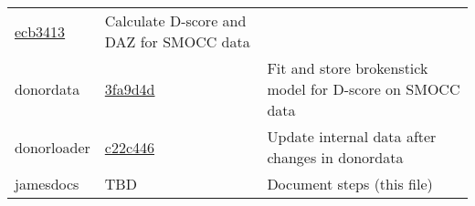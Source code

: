 \documentclass[]{book}
\begin{document}
\begin{longtable}[]{@{}lll@{}}
\begin{minipage}[t]{0.29\columnwidth}
\href{https://github.com/stefvanbuuren/donordata/commit/ecb3413b115c3193135b1af118597768b083dc41}{ecb3413}\strut
\end{minipage} & \begin{minipage}[t]{0.36\columnwidth}\raggedright
Calculate D-score and DAZ for SMOCC data\strut
\end{minipage}\tabularnewline
\begin{minipage}[t]{0.26\columnwidth}\raggedright
donordata\strut
\end{minipage} & \begin{minipage}[t]{0.29\columnwidth}\raggedright
\href{https://github.com/stefvanbuuren/donordata/commit/3fa9d4de347d09ccff32a887cf6bd8dadfdfaeb6}{3fa9d4d}\strut
\end{minipage} & \begin{minipage}[t]{0.36\columnwidth}\raggedright
Fit and store brokenstick model for D-score on SMOCC data\strut
\end{minipage}\tabularnewline
\begin{minipage}[t]{0.26\columnwidth}\raggedright
donorloader\strut
\end{minipage} & \begin{minipage}[t]{0.29\columnwidth}\raggedright
\href{https://github.com/stefvanbuuren/donorloader/commit/c22c44607b40ff6bda2009c25894362b68831275}{c22c446}\strut
\end{minipage} & \begin{minipage}[t]{0.36\columnwidth}\raggedright
Update internal data after changes in donordata\strut
\end{minipage}\tabularnewline
\begin{minipage}[t]{0.26\columnwidth}\raggedright
jamesdocs\strut
\end{minipage} & \begin{minipage}[t]{0.29\columnwidth}\raggedright
TBD\strut
\end{minipage} & \begin{minipage}[t]{0.36\columnwidth}\raggedright
Document steps (this file)\strut
\end{minipage}\tabularnewline
\bottomrule
\end{longtable}


\end{document}
